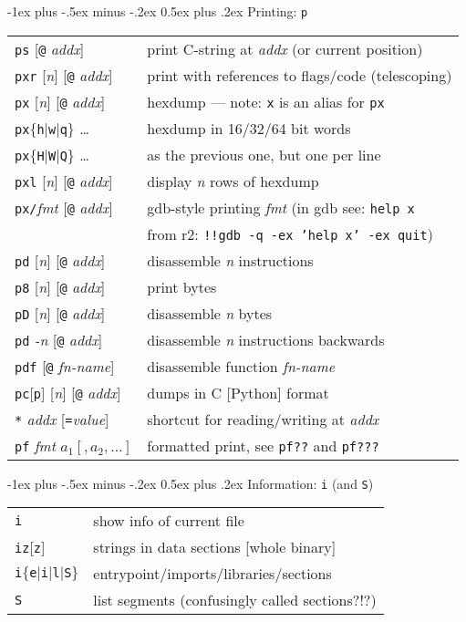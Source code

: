 \documentclass[a4paper,landscape]{article}
\makeatletter
\renewcommand{\section}{\@startsection{section}{1}{0mm}%
                                {-1ex plus -.5ex minus -.2ex}%
                                {0.5ex plus .2ex}%
                                {\normalfont\large\bfseries}}
\makeatother
\begin{document}
\begin{multicols*}{3}
\section{Printing: \texttt{p}}
\begin{tabular}{@{}ll@{}}
\texttt{ps} [\texttt{@} \textit{addx}]& print C-string at \textit{addx} (or current position) \\
\texttt{pxr} [\textit{n}] [\texttt{@} \textit{addx}] & print with references to flags/code (telescoping) \\
\texttt{px} [\textit{n}] [\texttt{@} \textit{addx}] & hexdump --- note: \texttt{x} is an alias for \texttt{px}\\
\texttt{px}$\{$\texttt{h}$|$\texttt{w}$|$\texttt{q}$\}$ \ldots & hexdump in 16/32/64 bit words \\
\texttt{px}$\{$\texttt{H}$|$\texttt{W}$|$\texttt{Q}$\}$ \ldots & as the previous one, but one per line \\
\texttt{pxl} [\textit{n}] [\texttt{@} \textit{addx}] & display \textit{n} rows of hexdump \\
\texttt{px/}\textit{fmt} [\texttt{@} \textit{addx}] & gdb-style printing \textit{fmt} (in gdb see: \texttt{help x} \\ & from r2: \texttt{!!gdb -q -ex 'help x' -ex quit}) \\
\texttt{pd} [\textit{n}] [\texttt{@} \textit{addx}] & disassemble \textit{n} instructions \\
\texttt{p8} [\textit{n}] [\texttt{@} \textit{addx}] & print bytes \\
\texttt{pD} [\textit{n}] [\texttt{@} \textit{addx}] & disassemble \textit{n} bytes \\
\texttt{pd} \textit{-n}  [\texttt{@} \textit{addx}] & disassemble \textit{n} instructions backwards \\
\texttt{pdf} [\texttt{@} \textit{fn-name}] & disassemble function \textit{fn-name} \\
\texttt{pc}[\texttt{p}] [\textit{n}] [\texttt{@} \textit{addx}] & dumps in C [Python] format \\
\texttt{*} \textit{addx} [\texttt{=}\textit{value}] & shortcut for reading/writing at \textit{addx} \\
\texttt{pf} \textit{fmt} $a_1 [,a_2,\dots]$ & formatted print, see \texttt{pf??} and \texttt{pf???} \\
\end{tabular}

\section{Information: \texttt{i} (and \texttt{S})}
\begin{tabular}{@{}ll@{}}
\texttt{i} & show info of current file \\
\texttt{iz}[\texttt{z}] & strings in data sections [whole binary] \\
\texttt{i}$\{$\texttt{e}$|$\texttt{i}$|$\texttt{l}$|$\texttt{S}$\}$ & entrypoint/imports/libraries/sections \\
\texttt{S} & list segments (confusingly called sections?!?) \\
\end{tabular}


\end{multicols*}
\end{document}
